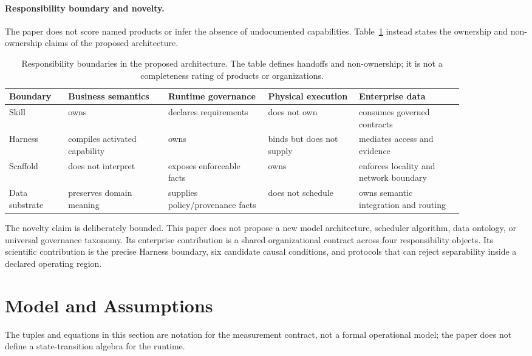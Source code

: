 \paragraph{Responsibility boundary and novelty.}
The paper does not score named products or infer the absence of undocumented capabilities. Table~\ref{tab:responsibility-boundary} instead states the ownership and non-ownership claims of the proposed architecture.

\begin{table}[t]
\centering
\caption{Responsibility boundaries in the proposed architecture. The table defines handoffs and non-ownership; it is not a completeness rating of products or organizations.}
\label{tab:responsibility-boundary}
\begin{tabular}{lp{0.22\linewidth}p{0.22\linewidth}p{0.20\linewidth}p{0.23\linewidth}}
\hline
Boundary & Business semantics & Runtime governance & Physical execution & Enterprise data \\
\hline
Skill & owns & declares requirements & does not own & consumes governed contracts \\
Harness & compiles activated capability & owns & binds but does not supply & mediates access and evidence \\
Scaffold & does not interpret & exposes enforceable facts & owns & enforces locality and network boundary \\
Data substrate & preserves domain meaning & supplies policy/provenance facts & does not schedule & owns semantic integration and routing \\
\hline
\end{tabular}
\end{table}

The novelty claim is deliberately bounded. This paper does not propose a new model architecture, scheduler algorithm, data ontology, or universal governance taxonomy. Its enterprise contribution is a shared organizational contract across four responsibility objects. Its scientific contribution is the precise Harness boundary, six candidate causal conditions, and protocols that can reject separability inside a declared operating region.

\section{Model and Assumptions}
\label{sec:model}

The tuples and equations in this section are notation for the measurement contract, not a formal operational model; the paper does not define a state-transition algebra for the runtime.

